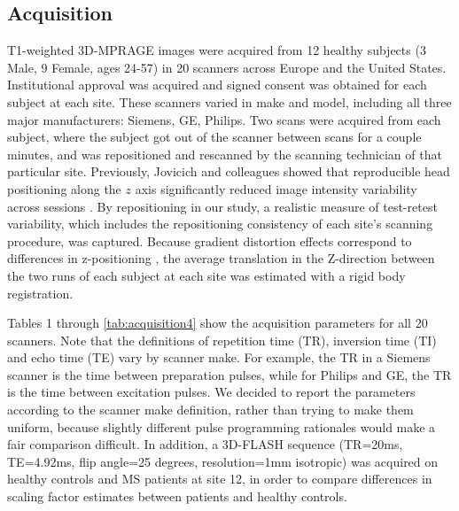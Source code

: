 \documentclass{article}
\begin{document}
\subsection{Acquisition}
T1-weighted 3D-MPRAGE images were acquired from 12 healthy subjects (3 Male, 9 Female, ages 24-57) in 20 scanners across Europe and the United States. Institutional approval was acquired and signed consent was obtained for each subject at each site. These scanners varied in make and model, including all three major manufacturers: Siemens, GE, Philips. Two scans were acquired from each subject, where the subject got out of the scanner between scans for a couple minutes, and was repositioned and rescanned by the scanning technician of that particular site. Previously, Jovicich and colleagues showed that reproducible head positioning along the $z$ axis significantly reduced image intensity variability across sessions \cite{freesurferReliability}. By repositioning in our study, a realistic measure of test-retest variability, which includes the repositioning consistency of each site's scanning procedure, was captured. Because gradient distortion effects correspond to differences in z-positioning \cite{caramanos2010gradient}, the average translation in the Z-direction between the two runs of each subject at each site was estimated with a rigid body registration. 

Tables 1 through \ref{tab:acquisition4} show the acquisition parameters for all 20 scanners. Note that the definitions of repetition time (TR), inversion time (TI) and echo time (TE) vary by scanner make. For example, the TR in a Siemens scanner is the time between preparation pulses, while for Philips and GE, the TR is the time between excitation pulses. We decided to report the parameters according to the scanner make definition, rather than trying to make them uniform, because slightly different pulse programming rationales would make a fair comparison difficult. In addition, a 3D-FLASH sequence (TR=20ms, TE=4.92ms, flip angle=25 degrees, resolution=1mm isotropic) was acquired on healthy controls and MS patients at site 12, in order to compare differences in scaling factor estimates between patients and healthy controls. 
\end{document}
